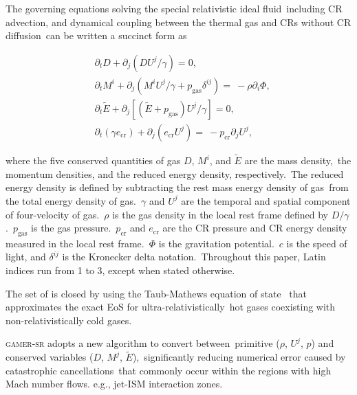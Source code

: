 \documentclass[twocolumn]{aastex631}
\begin{document}
  The governing equations solving the special relativistic ideal fluid\
  including CR advection, and dynamical coupling between the thermal gas and CRs without CR diffusion\
  can be written a succinct form as


  \begin{subequations}
    \label{governing-eq}
    \begin{align}
     &\partial_{t} D+\partial_{j} \left(DU^{j}/\gamma\right)=0,\label{D evolution}\\
     &\partial_{t} M^{i}+\partial_{j} \left(M^{i}U^{j}/\gamma+p_{\text{gas}}\delta^{ij}\right)=\
     -\rho\partial_{i}\Phi,\label{M evolution}\\
     &\partial_{t} \tilde{E}+\partial_j \left[\left(\tilde{E}+p_{\text{gas}}\right)U^{j}/\gamma\right]=0, \label{E evoltion}\\
     &\partial_{t} \left(\gamma e_{\text{cr}}\right) + \partial_{j} \left(e_{\text{cr}}U^{j}\right)=\
     -p_{\text{cr}} \partial_{j} U^{j},\label{D evolution}
    \end{align}
  \end{subequations}


  where the five conserved quantities of gas $D$, $M^{i}$, and $\tilde{E}$ are the mass density,\
  the momentum densities, and the reduced energy density, respectively.\
  The reduced energy density is defined by subtracting the rest mass energy density of gas\
  from the total energy density of gas.\
  $\gamma$ and $U^{j}$ are the temporal and spatial component of four-velocity of gas.\
  $\rho$ is the gas density in the local rest frame defined by $D/\gamma$.\
  $p_{\text{gas}}$ is the gas pressure.\
  $p_{\text{cr}}$ and $e_{\text{cr}}$ are the CR pressure and CR energy density measured in the local rest frame.\
  $\Phi$ is the gravitation potential.\
  $c$ is the speed of light, and $\delta^{ij}$ is the Kronecker delta notation.\
  Throughout this paper, Latin indices run from 1 to 3, except when stated otherwise.\

  The set of  is closed by using the Taub-Mathews equation of state \citep{Taub,TM_EOS}\
  that approximates the exact EoS \citep{Synge} for ultra-relativistically\
  hot gases coexisting with non-relativistically cold gases.

  \textsc{gamer-sr} adopts a new algorithm \citep{tseng2021} to convert between\
  primitive ($\rho$, $U^{j}$, $p$) and conserved variables ($D$, $M^{j}$, $\tilde{E}$),\
  significantly reducing numerical error caused by catastrophic cancellations\
  that commonly occur within the regions with high Mach number flows. e.g., jet-ISM interaction zones.
\end{document}
